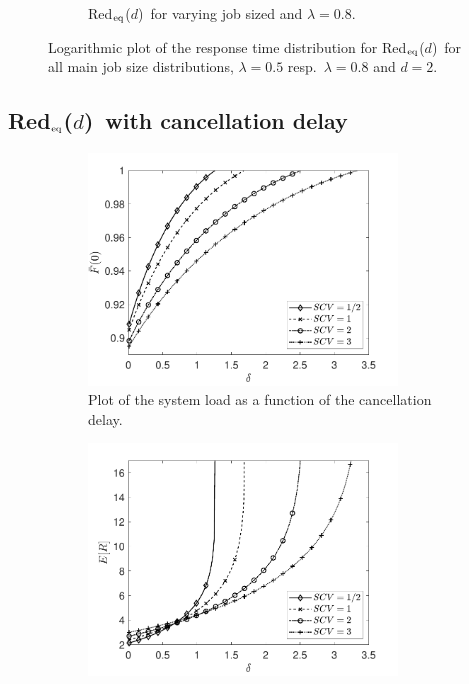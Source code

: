 \documentclass[12pt]{report}
\newcommand{\Redid}{Red$_{\textup{eq}}$($d$)}
\begin{document}
\begin{figure}[t]
\begin{subfigure}{.45\textwidth}
\begin{center}
\caption{\Redid\ for varying job sized and $\lambda=0.8$.}
\label{fig:tail_diffdists_lam08}
\end{center}
\end{subfigure}
\caption{Logarithmic plot of the response time distribution for \Redid\ for all main job size distributions, $\lambda = 0.5$ resp.~$\lambda=0.8$ and $d=2$.}
\label{fig:tail_diffdists}
\end{figure}

\color{black}
\subsection{\Redid\ with cancellation delay}
\begin{figure}[t]
\begin{subfigure}{.45\textwidth}
\begin{center}
\includegraphics[width=0.9\textwidth]{figures/Chapter3/plot_Fbar0_ifodelta.pdf}
\caption{Plot of the system load as a function of the cancellation delay.}
\label{fig:delay1}
\end{center}
\end{subfigure}
\begin{subfigure}{.45\textwidth}
\begin{center}
\includegraphics[width=0.9\textwidth]{figures/Chapter3/plot_MRT_ifodelta.pdf}

\end{center}
\end{subfigure}
\end{figure}
\end{document}

